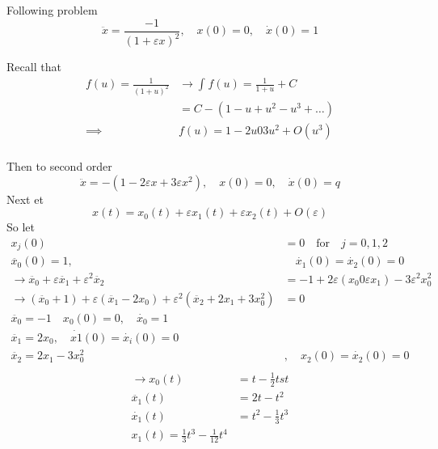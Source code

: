 \documentclass{article}
\theoremstyle{remark}
\newcommand{\newpara}
  {
  \vskip 0.4cm
  }
\begin{document}
\newpara
Following problem \[
\ddot{x} = \frac{-1}{\left( 1 + \varepsilon x \right)^2 }  , \quad  x\left( 0 \right) = 0 , \quad  \dot{x} \left( 0 \right) = 1  
\] 
\begin{tcolorbox}
  Recall that \[
    \begin{split}
  f\left( u \right) = \frac{1}{\left( 1 + u \right) ^2}   &  \to  \int_{}^{}  f\left( u \right) = \frac{1}{1+u} + C \\
  &= C - \left(  1- u + u^2 - u ^3 + \ldots \right) \\
  \implies   &  f\left( u \right) = 1- 2 u 0 3u ^2 + O\left( u^3 \right) \\
    \end{split} 
  \] 
\end{tcolorbox}

Then to second order \[
  \ddot{x} = - \left( 1 - 2 \varepsilon  x + 3 \varepsilon  x ^2 \right) , \quad  x\left( 0 \right) = 0 , \quad  \dot{x}\left( 0 \right) =q  
\] 
Next et \[
x\left( t \right) = x_{0} \left( t \right) + \varepsilon x_{1} \left( t \right) + \varepsilon x_{2} \left( t \right) + O\left( \varepsilon  \right)
\] 
So let \[
  \begin{split}
x_{j} \left( 0 \right)    & = 0 \quad  \text{for} \quad  j = 0,1,2 \\
\ddot{x_{0}} \left( 0 \right)  = 1 ,  &  \quad  \dot{x_{1} }\left( 0 \right) = \dot{x_{2}}\left( 0 \right) = 0  \\
\to  \ddot{x_{0}} + \varepsilon \ddot{x_{1}} + \varepsilon ^2 \ddot{x_{2}}   & = -1 + 2\varepsilon  \left( x_{0} 0 \varepsilon  x_{1} \right)  - 3 \varepsilon ^2 x_{0} ^2 \\
\to  \left( \ddot{x_{0}} + 1 \right) + \varepsilon \left( \ddot{x_{1}} - 2 x_{0} \right)  + \varepsilon ^2 \left( \ddot{x_{2}} + 2 x_{1}  + 3 x_{0} ^{2} \right) &=  0 \\
\ddot{x_{0}} = -1 \quad  x_{0} \left( 0 \right) = 0 , \quad  \dot{x_{0}} = 1  &  \\
\ddot{x_{1}} = 2x_{0} , \quad  \dot{x1 } \left( 0 \right) = \dot{x_{i}}\left( 0 \right) = 0  &  \\
\ddot{x_{2}} =  2 x_{1} - 3 x_{0}^2   & , \quad  x_{2} \left( 0 \right) = \dot{x_{2}} \left( 0 \right) = 0 \\  
  \end{split} 
\] 
\[
  \begin{split}
\to  x_{0} \left( t \right) &=  t- \frac{1}{2}tst \\
\ddot{x_{1}}\left( t \right) &=  2t - t^2 \\
\dot{x_{1}}\left( t \right) &=  t ^2 - \frac{1}{3} t^3 \\
x_{1} \left( t \right) = \frac{1}{3} t^3 - \frac{1}{12} t ^{4}
  \end{split} 
\] 
\end{document}

